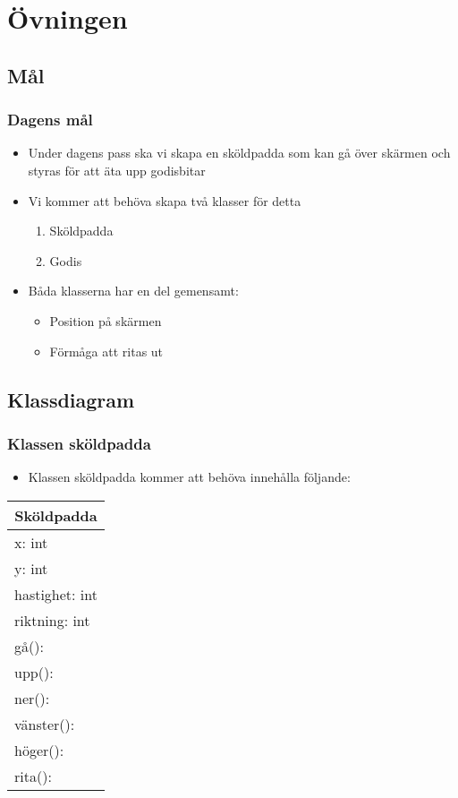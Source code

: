 \documentclass[aspectratio=169]{beamer}
\begin{document}
\section{Övningen}

\subsection{Mål}

\begin{frame}
	\frametitle{Dagens mål}
	
	\begin{itemize}
		\item Under dagens pass ska vi skapa en sköldpadda som kan gå över skärmen och styras för att äta upp godisbitar
		\item Vi kommer att behöva skapa två klasser för detta
		\begin{enumerate}
			\item Sköldpadda
			\item Godis
		\end{enumerate}
		\item Båda klasserna har en del gemensamt:
			\begin{itemize}
				\item Position på skärmen
				\item Förmåga att ritas ut
			\end{itemize}
	\end{itemize}
	
\end{frame}

\subsection{Klassdiagram}

\begin{frame}
	\frametitle{Klassen sköldpadda}
	
	\begin{itemize}
		\item Klassen sköldpadda kommer att behöva innehålla följande:
	\end{itemize}
	\centering
	\begin{tabular}{|l|}
		\hline
		\multicolumn{1}{|c|}{Sköldpadda} \\ \hline
		x: int \\
		y: int \\
		hastighet: int \\
		riktning: int\\ \hline
		gå():\\
		upp():\\
		ner():\\
		vänster():\\
		höger():\\
		rita():\\ \hline
	\end{tabular}
	
\end{frame}
\end{document}
